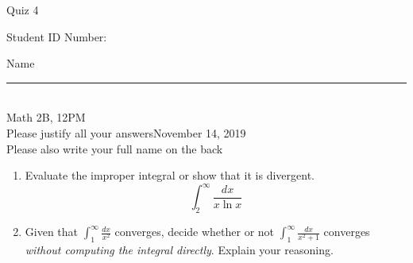 \documentclass[12pt]{article}
\begin{document}
\begin{flushleft} 
\centerline{\LARGE{Quiz 4}} 
\vspace{5 mm}
{Student ID Number:}\hfill  
{Name \rule {2 in}{0.01in}}\\
Math 2B, 12PM
\\
{Please justify all your answers}\hfill {November 14, 2019}
\\
{Please also write your full name on the back} 

\medskip
\end{flushleft}

\begin{enumerate}
	\item Evaluate the improper integral or show that it is divergent.
	\[
	\int_2^\infty \frac{dx}{x\ln x}
	\]

	\vfill
	\item Given that $\int_1^\infty\frac{dx}{x^2}$ converges, decide whether or not $\int_1^\infty \frac{dx}{x^2+1}$ converges \textit{without computing the integral directly}. Explain your reasoning.
	\vfill

\end{enumerate}

\end{document}
